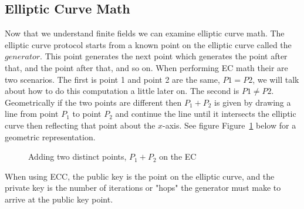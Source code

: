 \subsection{Elliptic Curve Math}
Now that we understand finite fields we can examine elliptic curve math. The elliptic curve protocol starts from a known point on the elliptic curve called the $generator$.  This point generates the next point which generates the point after that, and the point after that, and so on.  When performing EC math their are two scenarios.  The first is point 1 and point 2 are the same, $P1 = P2$, we will talk about how to do this computation a little later on. The second is $P1 \neq P2$. Geometrically if the two points are different then $P_1 + P_2$ is given by drawing a line from point $P_1$ to point $P_2$ and continue the line until it intersects the elliptic curve then reflecting that point about the $x$-axis.  See figure Figure~\ref{fig:DH:DHKE_6} below for a geometric representation.

\begin{figure}[H]
	  \caption{\label{fig:DH:DHKE_6} Adding  two distinct points, $P_1 + P_2$ on the EC}
\end{figure}

When using ECC, the public key is the point on the elliptic curve, and the private key is the number of iterations or "hops" the generator must make to arrive at the public key point.  

